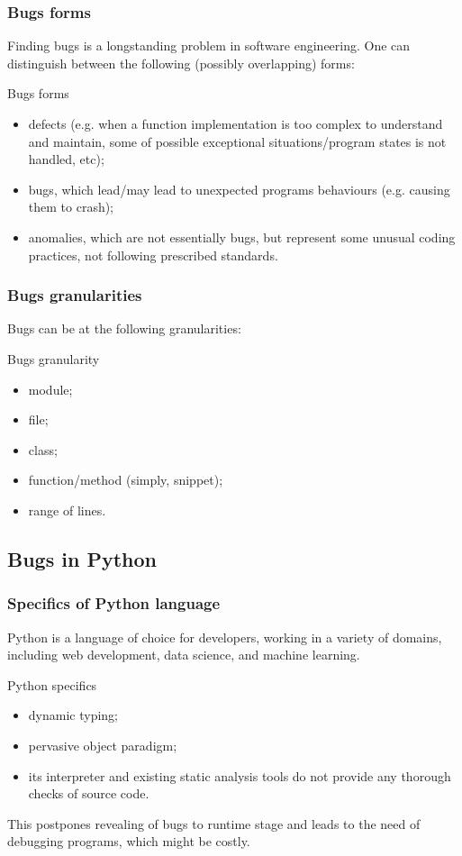 \documentclass{beamer}
\begin{document}
\begin{frame}
\frametitle{Bugs forms}

Finding bugs is a longstanding problem in software engineering.
One can distinguish between the following (possibly overlapping) forms:

\begin{block}{Bugs forms}
\begin{itemize}
\item defects (e.g. when a function implementation is too complex to understand and maintain, some of possible exceptional situations/program states is not handled, etc);
\item bugs, which lead/may lead to unexpected programs behaviours (e.g. causing them to crash);
\item anomalies, which are not essentially bugs, but represent some unusual coding practices, not following prescribed standards.
\end{itemize}
\end{block}

\end{frame}


\begin{frame}
\frametitle{Bugs granularities}

Bugs can be at the following granularities:
\begin{block}{Bugs granularity}
\begin{itemize}
\item module;
\item file;
\item class;
\item function/method (simply, snippet);
\item range of lines.
\end{itemize}
\end{block}

\end{frame}

\subsection{Bugs in Python}

\begin{frame}
\frametitle{Specifics of Python language}

Python is a language of choice for developers, working in a variety of domains, including 
web development, data science, and machine learning.

\begin{block}{Python specifics}
\begin{itemize}
\item dynamic typing;
\item pervasive object paradigm;
\item its interpreter and existing static analysis tools do not
provide any thorough checks of source code.
\end{itemize}

This
postpones revealing of bugs to runtime stage and leads to
the need of debugging programs, which might be costly.
\end{block}


\end{frame}
\end{document}

